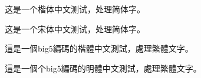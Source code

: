 \documentclass{article}
\begin{document}
    \begin{CJK}{UTF8}{gkai}

    这是一个楷体中文测试，处理简体字。

    \end{CJK}



    \begin{CJK}{UTF8}{gbsn}

    这是一个宋体中文测试，处理简体字。

    \end{CJK}



    \begin{CJK}{UTF8}{bkai}

    這是一個big5編碼的楷體中文測試，處理繁體文字。

    \end{CJK}



    \begin{CJK}{UTF8}{bsmi}

    這是一個个big5編碼的明體中文測試，處理繁體文字。

    \end{CJK}

    
\end{document}
